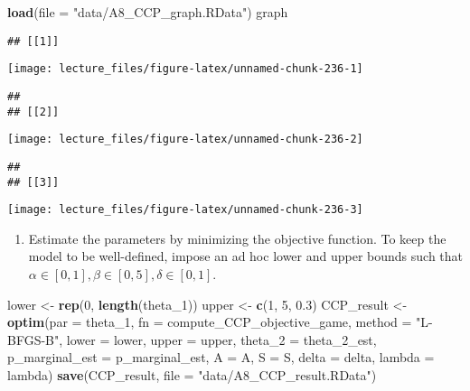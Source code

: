 \documentclass[
]{book}
\newenvironment{Shaded}{\begin{snugshade}}{\end{snugshade}}
\newcommand{\DataTypeTok}[1]{\textcolor[rgb]{0.13,0.29,0.53}{#1}}
\newcommand{\DecValTok}[1]{\textcolor[rgb]{0.00,0.00,0.81}{#1}}
\newcommand{\FloatTok}[1]{\textcolor[rgb]{0.00,0.00,0.81}{#1}}
\newcommand{\KeywordTok}[1]{\textcolor[rgb]{0.13,0.29,0.53}{\textbf{#1}}}
\newcommand{\NormalTok}[1]{#1}
\newcommand{\StringTok}[1]{\textcolor[rgb]{0.31,0.60,0.02}{#1}}
\providecommand{\tightlist}{%
  \setlength{\itemsep}{0pt}\setlength{\parskip}{0pt}}
\begin{document}
\begin{Shaded}
\begin{Highlighting}[]
\KeywordTok{load}\NormalTok{(}\DataTypeTok{file =} \StringTok{"data/A8_CCP_graph.RData"}\NormalTok{)}
\NormalTok{graph}
\end{Highlighting}
\end{Shaded}

\begin{verbatim}
## [[1]]
\end{verbatim}

\begin{center}\texttt{[image: lecture\_files/figure-latex/unnamed-chunk-236-1]} \end{center}

\begin{verbatim}
## 
## [[2]]
\end{verbatim}

\begin{center}\texttt{[image: lecture\_files/figure-latex/unnamed-chunk-236-2]} \end{center}

\begin{verbatim}
## 
## [[3]]
\end{verbatim}

\begin{center}\texttt{[image: lecture\_files/figure-latex/unnamed-chunk-236-3]} \end{center}

\begin{enumerate}
\def\labelenumi{\arabic{enumi}.}
\setcounter{enumi}{3}
\tightlist
\item
  Estimate the parameters by minimizing the objective function. To keep the model to be well-defined, impose an ad hoc lower and upper bounds such that \(\alpha \in [0, 1], \beta \in [0, 5], \delta \in [0, 1]\).
\end{enumerate}

\begin{Shaded}
\begin{Highlighting}[]
\NormalTok{lower <-}\StringTok{ }\KeywordTok{rep}\NormalTok{(}\DecValTok{0}\NormalTok{, }\KeywordTok{length}\NormalTok{(theta_}\DecValTok{1}\NormalTok{))}
\NormalTok{upper <-}\StringTok{ }\KeywordTok{c}\NormalTok{(}\DecValTok{1}\NormalTok{, }\DecValTok{5}\NormalTok{, }\FloatTok{0.3}\NormalTok{)}
\NormalTok{CCP_result <-}
\StringTok{  }\KeywordTok{optim}\NormalTok{(}\DataTypeTok{par =}\NormalTok{ theta_}\DecValTok{1}\NormalTok{,}
        \DataTypeTok{fn =}\NormalTok{ compute_CCP_objective_game,}
        \DataTypeTok{method =} \StringTok{"L-BFGS-B"}\NormalTok{,}
        \DataTypeTok{lower =}\NormalTok{ lower,}
        \DataTypeTok{upper =}\NormalTok{ upper,}
        \DataTypeTok{theta_2 =}\NormalTok{ theta_}\DecValTok{2}\NormalTok{_est,}
        \DataTypeTok{p_marginal_est =}\NormalTok{ p_marginal_est,}
        \DataTypeTok{A =}\NormalTok{ A,}
        \DataTypeTok{S =}\NormalTok{ S,}
        \DataTypeTok{delta =}\NormalTok{ delta,}
        \DataTypeTok{lambda =}\NormalTok{ lambda)}
\KeywordTok{save}\NormalTok{(CCP_result, }\DataTypeTok{file =} \StringTok{"data/A8_CCP_result.RData"}\NormalTok{)}
\end{Highlighting}
\end{Shaded}
\end{document}
